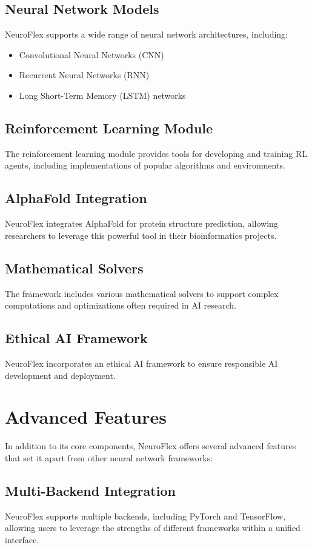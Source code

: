 \documentclass[conference]{IEEEtran}
\begin{document}
\subsection{Neural Network Models}
NeuroFlex supports a wide range of neural network architectures, including:
\begin{itemize}
    \item Convolutional Neural Networks (CNN)
    \item Recurrent Neural Networks (RNN)
    \item Long Short-Term Memory (LSTM) networks
\end{itemize}

\subsection{Reinforcement Learning Module}
The reinforcement learning module provides tools for developing and training RL agents, including implementations of popular algorithms and environments.

\subsection{AlphaFold Integration}
NeuroFlex integrates AlphaFold for protein structure prediction, allowing researchers to leverage this powerful tool in their bioinformatics projects.

\subsection{Mathematical Solvers}
The framework includes various mathematical solvers to support complex computations and optimizations often required in AI research.

\subsection{Ethical AI Framework}
NeuroFlex incorporates an ethical AI framework to ensure responsible AI development and deployment.

\section{Advanced Features}
In addition to its core components, NeuroFlex offers several advanced features that set it apart from other neural network frameworks:

\subsection{Multi-Backend Integration}
NeuroFlex supports multiple backends, including PyTorch and TensorFlow, allowing users to leverage the strengths of different frameworks within a unified interface.
\end{document}
